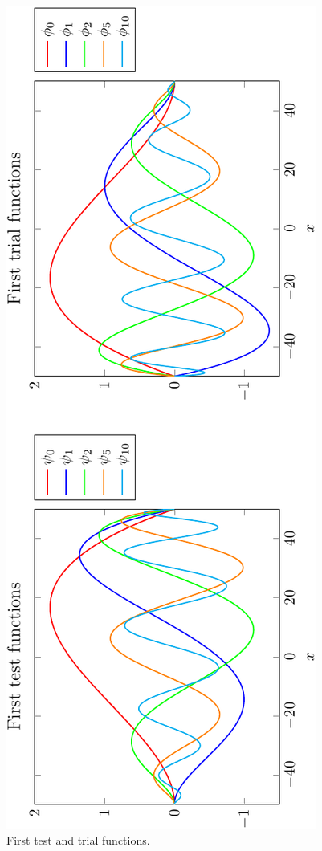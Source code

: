 %
\begin{center}
\begin{figure}[!h]
\includegraphics[scale=0.6,angle=270]{images/plotbasis2.pdf}
\caption{First test and trial functions.}
\label{basisfunctions}
\end{figure}
\end{center}


